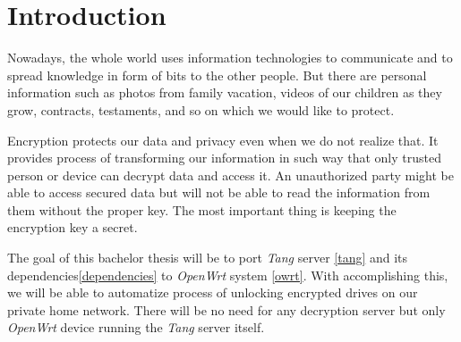 \documentclass[../xdudla00-porting-Tang-to-Open-WRT.tex]{subfiles}
\begin{document}
\chapter{Introduction}\label{introduction}

Nowadays, the whole world uses information technologies to communicate and to spread knowledge in form of bits to the other people.
But there are personal information such as photos from family vacation, videos of our children as they grow, contracts, testaments, and so on which we would like to protect.

Encryption protects our data and privacy even when we do not realize that.
It provides process of transforming our information in such way that only trusted person or device can decrypt data and access it.
An unauthorized party might be able to access secured data but will not be able to read the information from them without the proper key.
The most important thing is keeping the encryption key a secret.

The goal of this bachelor thesis will be to port {\it Tang} server \ref{tang} and its dependencies\ref{dependencies} to {\it OpenWrt} system \ref{owrt}.
With accomplishing this, we will be able to automatize process of unlocking encrypted drives on our private home network.
There will be no need for any decryption server but only {\it OpenWrt} device running the {\it Tang} server itself.
\end{document}

